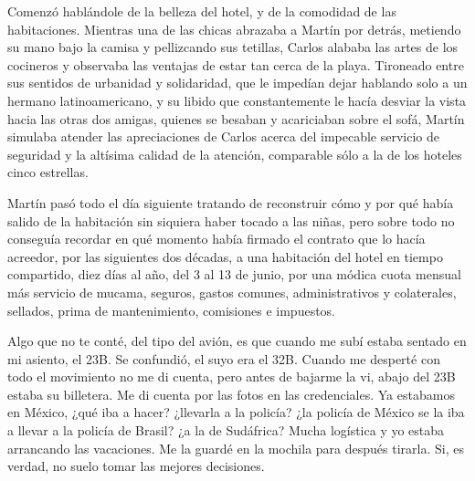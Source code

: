 \documentclass[11pt,twoside,openright,a6paper]{book}
\begin{document}
Comenzó hablándole de la belleza del hotel, y de la comodidad de las
habitaciones. Mientras una de las chicas abrazaba a Martín por detrás,
metiendo su mano bajo la camisa y pellizcando sus tetillas, Carlos alababa
las artes de los cocineros y observaba las ventajas de estar tan cerca de
la playa. Tironeado entre sus sentidos de urbanidad y solidaridad, que le
impedían dejar hablando solo a un hermano latinoamericano, y su libido
que constantemente le hacía desviar la vista hacia las otras dos amigas,
quienes se besaban y acariciaban sobre el sofá, Martín simulaba atender
las apreciaciones de Carlos acerca del impecable servicio de seguridad y
la altísima calidad de la atención, comparable sólo a la de los hoteles
cinco estrellas.

Martín pasó todo el día siguiente tratando de reconstruir cómo y por qué
había salido de la habitación sin siquiera haber tocado a las niñas, pero
sobre todo no conseguía recordar en qué momento había firmado el contrato
que lo hacía acreedor, por las siguientes dos décadas, a una habitación
del hotel en tiempo compartido, diez días al año, del 3 al 13 de junio,
por una módica cuota mensual más servicio de mucama, seguros, gastos
comunes, administrativos y colaterales, sellados, prima de mantenimiento,
comisiones e impuestos.


\vspace{0.5cm}
\hrulefill\hspace{0.2cm} \decofourleft\decofourright \hspace{0.2cm} \hrulefill
\vspace{0.5cm}

Algo que no te conté, del tipo del avión, es que cuando me subí estaba
sentado en mi asiento, el 23B. Se confundió, el suyo era el 32B. Cuando
me desperté con todo el movimiento no me di cuenta, pero antes de bajarme
la vi, abajo del 23B estaba su billetera. Me di cuenta por las fotos en
las credenciales. Ya estabamos en México, ¿qué iba a hacer? ¿llevarla
a la policía? ¿la policía de México se la iba a llevar a la policía
de Brasil? ¿a la de Sudáfrica? Mucha logística y yo estaba arrancando
las vacaciones. Me la guardé en la mochila para después tirarla. Si,
es verdad, no suelo tomar las mejores decisiones.


\vspace{0.5cm}
\hrulefill\hspace{0.2cm} \decofourleft\decofourright \hspace{0.2cm} \hrulefill
\vspace{0.5cm}
\end{document}
